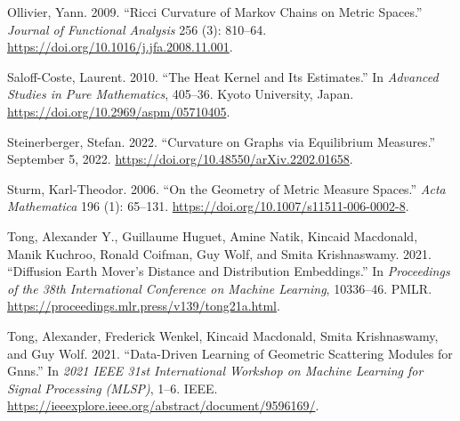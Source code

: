 \documentclass[
  letterpaper,
  DIV=11,
  numbers=noendperiod]{scrartcl}
\newlength{\cslhangindent}
\newenvironment{CSLReferences}[2] %
 {\begin{list}{}{%
  \setlength{\itemindent}{0pt}
  \setlength{\leftmargin}{0pt}
  \setlength{\parsep}{0pt}
  \ifodd #1
   \setlength{\leftmargin}{\cslhangindent}
   \setlength{\itemindent}{-1\cslhangindent}
  \fi
  \setlength{\itemsep}{#2\baselineskip}}}
 {\end{list}}
\theoremstyle{plain}
\theoremstyle{plain}
\theoremstyle{definition}
\theoremstyle{plain}
\theoremstyle{definition}
\theoremstyle{remark}
\begin{document}
\begin{CSLReferences}{1}{0}
Ollivier, Yann. 2009. {``Ricci Curvature of {Markov} Chains on Metric
Spaces.''} \emph{Journal of Functional Analysis} 256 (3): 810--64.
\url{https://doi.org/10.1016/j.jfa.2008.11.001}.

Saloff-Coste, Laurent. 2010. {``The Heat Kernel and Its Estimates.''} In
\emph{Advanced {Studies} in {Pure Mathematics}}, 405--36. Kyoto
University, Japan. \url{https://doi.org/10.2969/aspm/05710405}.

Steinerberger, Stefan. 2022. {``Curvature on {Graphs} via {Equilibrium
Measures}.''} September 5, 2022.
\url{https://doi.org/10.48550/arXiv.2202.01658}.

Sturm, Karl-Theodor. 2006. {``On the Geometry of Metric Measure
Spaces.''} \emph{Acta Mathematica} 196 (1): 65--131.
\url{https://doi.org/10.1007/s11511-006-0002-8}.

Tong, Alexander Y., Guillaume Huguet, Amine Natik, Kincaid Macdonald,
Manik Kuchroo, Ronald Coifman, Guy Wolf, and Smita Krishnaswamy. 2021.
{``Diffusion {Earth Mover}'s {Distance} and {Distribution
Embeddings}.''} In \emph{Proceedings of the 38th {International
Conference} on {Machine Learning}}, 10336--46. PMLR.
\url{https://proceedings.mlr.press/v139/tong21a.html}.

Tong, Alexander, Frederick Wenkel, Kincaid Macdonald, Smita
Krishnaswamy, and Guy Wolf. 2021. {``Data-Driven Learning of Geometric
Scattering Modules for Gnns.''} In \emph{2021 {IEEE} 31st {International
Workshop} on {Machine Learning} for {Signal Processing} ({MLSP})}, 1--6.
IEEE. \url{https://ieeexplore.ieee.org/abstract/document/9596169/}.

\end{CSLReferences}
\end{document}
